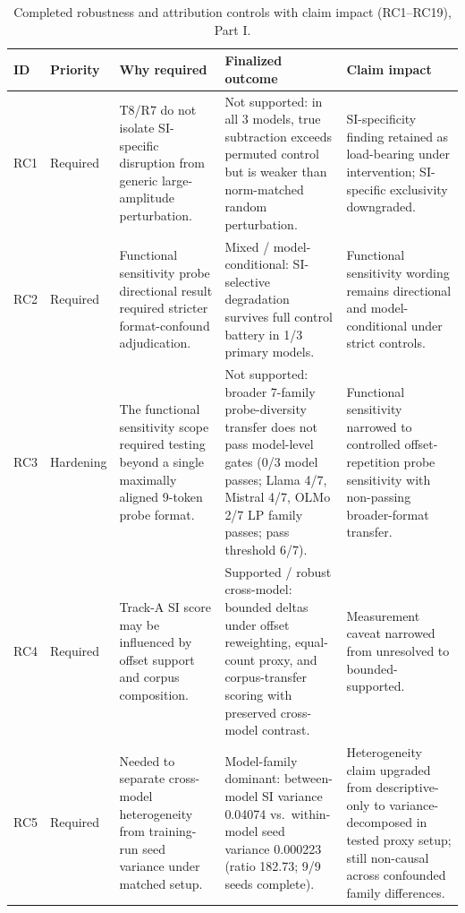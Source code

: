\documentclass{article}
\begin{document}
\begin{table}[htbp]
\centering
\scriptsize
\setlength{\tabcolsep}{3pt}
\caption{Completed robustness and attribution controls with claim impact (RC1--RC19), Part I.}
\label{tab:running_controls}
\begin{tabular}{p{1.1cm}p{1.5cm}p{3.4cm}p{3.7cm}p{2.5cm}}
\toprule
ID & Priority & Why required & Finalized outcome & Claim impact \\
\midrule
RC1 & Required & T8/R7 do not isolate SI-specific disruption from generic large-amplitude perturbation. & Not supported: in all 3 models, true subtraction exceeds permuted control but is weaker than norm-matched random perturbation. & SI-specificity finding retained as load-bearing under intervention; SI-specific exclusivity downgraded. \\

RC2 & Required & Functional sensitivity probe directional result required stricter format-confound adjudication. & Mixed / model-conditional: SI-selective degradation survives full control battery in 1/3 primary models. & Functional sensitivity wording remains directional and model-conditional under strict controls. \\

RC3 & Hardening & The functional sensitivity scope required testing beyond a single maximally aligned 9-token probe format. & Not supported: broader 7-family probe-diversity transfer does not pass model-level gates (0/3 model passes; Llama 4/7, Mistral 4/7, OLMo 2/7 LP family passes; pass threshold 6/7). & Functional sensitivity narrowed to controlled offset-repetition probe sensitivity with non-passing broader-format transfer. \\

RC4 & Required & Track-A SI score may be influenced by offset support and corpus composition. & Supported / robust cross-model: bounded deltas under offset reweighting, equal-count proxy, and corpus-transfer scoring with preserved cross-model contrast. & Measurement caveat narrowed from unresolved to bounded-supported. \\

RC5 & Required & Needed to separate cross-model heterogeneity from training-run seed variance under matched setup. & Model-family dominant: between-model SI variance 0.04074 vs.\ within-model seed variance 0.000223 (ratio 182.73; 9/9 seeds complete). & Heterogeneity claim upgraded from descriptive-only to variance-decomposed in tested proxy setup; still non-causal across confounded family differences. \\


\end{tabular}
\end{table}
\end{document}
